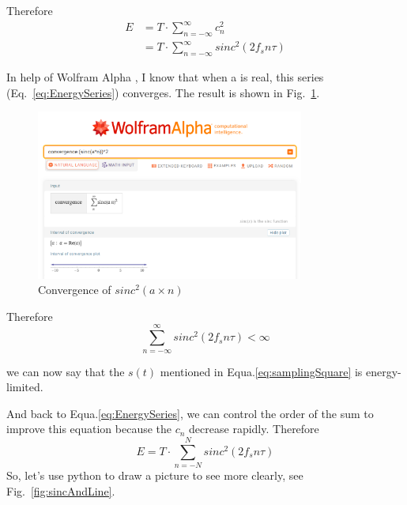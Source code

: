 \documentclass{article}
\begin{document}

Therefore
\begin{equation}
\begin{aligned}
E &= T \cdot \sum_{n = -\infty}^{\infty} c_n^2 \\ 
&= T \cdot \sum_{n = -\infty}^{\infty} sinc^2(2f_sn\tau)
\end{aligned}
\label{eq:EnergySeries}
\end{equation}

\newpage

In help of Wolfram Alpha \cite{sinc_convergence}, I know that when a is real, this series (Eq.~\ref{eq:EnergySeries}) converges. 
The result is shown in Fig.~\ref{fig:sinc_convergence}.

\begin{figure}[htbp]
    \centering
    \includegraphics[keepaspectratio,width=250pt]{../pic/sinc_convergence.png}
    \caption{Convergence of $sinc^2(a\times n)$}
    \label{fig:sinc_convergence}
\end{figure}


Therefore
\begin{equation*}
\sum_{n = -\infty}^{\infty} sinc^2(2f_sn\tau) < \infty
\end{equation*}

we can now say that the $s(t)$ mentioned in Equa.\ref{eq:samplingSquare} is energy-limited.

And back to Equa.\ref{eq:EnergySeries}, we can control the order of the sum to improve this equation because the $c_n$ decrease rapidly. Therefore
$$
E = T \cdot \sum_{n = -N}^{N} sinc^2(2f_sn\tau)
$$
So, let's use python to draw a picture to see more clearly, see Fig.~\ref{fig:sincAndLine}.
\end{document}
